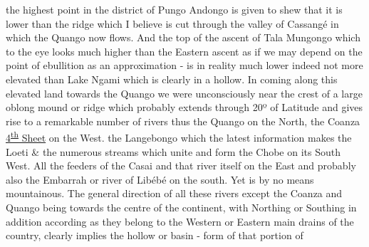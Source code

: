 \documentclass[11pt,twoside]{article}\makeatletter
\begin{document}
  \newline  \indent the highest point in the district of  \newline Pungo Andongo is given to shew that  \newline it is lower than the ridge which I believe  \newline is cut through the valley of Cassangé in which the Quango now flows. And  \newline the top of the ascent of Tala Mungongo  \newline which to the eye looks much higher than  \newline the Eastern ascent as if we may  \newline depend on the point of ebullition as  \newline an approximation - is in reality much  \newline lower indeed not more elevated than  \newline Lake Ngami which is clearly in a  \newline hollow. In coming along this elevated  \newline land towards the Quango we were  \newline unconsciously near the crest of a large  \newline oblong mound or ridge which probably  \newline extends through 20º of Latitude and gives  \newline rise to a remarkable number of rivers  \newline thus the Quango on the North, the Coanza {\newline \newline \noindent [0005]}  \newline \uline{4\textsuperscript{\uline{th}} Sheet} \newline  \newline on the West. the Langebongo which the  \newline latest information makes the Loeti \& the  \newline numerous streams which unite and form  \newline the Chobe on its South West. All the feeders  \newline of the Casai and that river itself on the  \newline East and probably also the Embarrah or  \newline river of Libébé on the south. Yet is by  \newline no means mountainous. The general direction of all these rivers except the  \newline Coanza and Quango being towards the  \newline centre of the continent, with Northing or  \newline Southing in addition according as  \newline they belong to the Western or Eastern  \newline main drains of the country, clearly  \newline implies the hollow or basin - form  \newline of that portion of 
\end{document}
